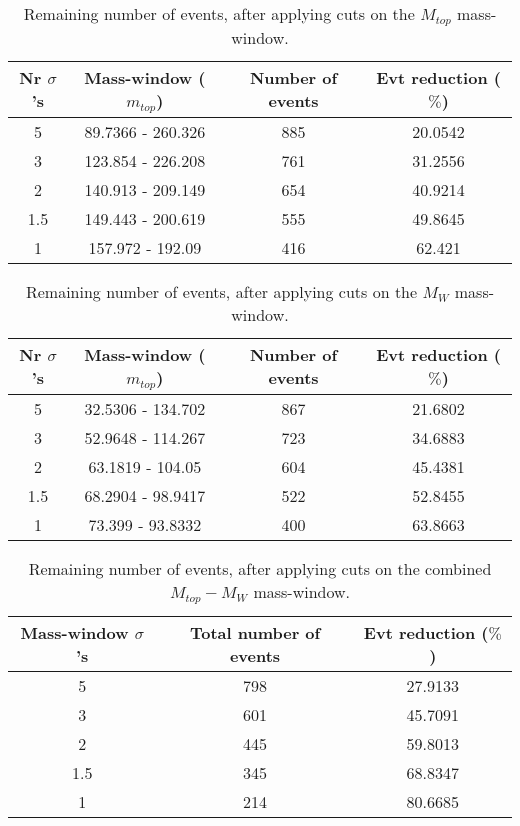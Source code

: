 \documentclass{article}
\begin{document}
 \begin{table}[h!t] 
  \caption{Remaining number of events, after applying cuts on the $M_{top}$ mass-window.} 
  \centering 
   \begin{tabular}{c|c|c|c|}
     Nr $\sigma$'s & Mass-window ($m_{top}$)   & Number of events   & Evt reduction ($\%$)     \\
     \hline
     5 & 89.7366 - 260.326  &   885 &  20.0542 \\ 
     3 & 123.854 - 226.208  &   761 &  31.2556 \\ 
     2 & 140.913 - 209.149  &   654 &  40.9214 \\ 
     1.5 & 149.443 - 200.619  &   555 &  49.8645 \\ 
     1 & 157.972 - 192.09  &   416 &  62.421 \\ 
   \end{tabular} 
 \end{table} 
 
 \begin{table}[h!t] 
  \caption{Remaining number of events, after applying cuts on the $M_{W}$ mass-window.} 
  \centering 
   \begin{tabular}{c|c|c|c|}
     Nr $\sigma$'s & Mass-window ($m_{top}$)    & Number of events   & Evt reduction ($\%$)    \\
     \hline
     5 & 32.5306 - 134.702  &   867 & 21.6802 \\ 
     3 & 52.9648 - 114.267  &   723 & 34.6883 \\ 
     2 & 63.1819 - 104.05  &   604 & 45.4381 \\ 
     1.5 & 68.2904 - 98.9417  &   522 & 52.8455 \\ 
     1 & 73.399 - 93.8332  &   400 & 63.8663 \\ 
   \end{tabular} 
 \end{table} 
 
 \begin{table}[h!t] 
  \caption{Remaining number of events, after applying cuts on the combined $M_{top}-M_{W}$ mass-window.} 
  \centering 
   \begin{tabular}{c|c|c|} 
     Mass-window $\sigma$'s & Total number of events    & Evt reduction ($\%$)     \\ 
     \hline
     5 & 798 & 27.9133 \\ 
     3 & 601 & 45.7091 \\ 
     2 & 445 & 59.8013 \\ 
     1.5 & 345 & 68.8347 \\ 
     1 & 214 & 80.6685 \\ 
   \end{tabular} 
 \end{table} 
 
\end{document}
